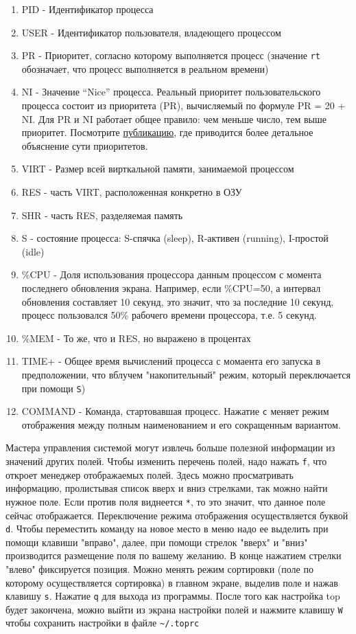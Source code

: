 \documentclass{article}
\begin{document}
\begin{enumerate}
\tightlist
\item
  PID - Идентификатор процесса
\item
  USER - Идентификатор пользователя, владеющего процессом
\item
  PR - Приоритет, согласно которому выполняется процесс (значение
  \texttt{rt} обозначает, что процесс выполняется в реальном времени)
\item
  NI - Значение ``Nice'' процесса. Реальный приоритет пользовательского
  процесса состоит из приоритета (PR), вычисляемый по формуле PR = 20 +
  NI. Для PR и NI работает общее правило: чем меньше число, тем выше
  приоритет. Посмотрите
  \href{https://askubuntu.com/a/656787/917201}{публикацию}, где
  приводится более детальное объяснение сути приоритетов.
\item
  VIRT - Размер всей вирткальной памяти, занимаемой процессом
\item
  RES - часть VIRT, расположенная конкретно в ОЗУ
\item
  SHR - часть RES, разделяемая память
\item
  S - состояние процесса: S-спячка (sleep), R-активен (running),
  I-простой (idle)
\item
  \%CPU - Доля использования процессора данным процессом с момента
  последнего обновления экрана. Например, если \%CPU=50, а интервал
  обновления составляет 10 секунд, это значит, что за последние 10
  секунд, процесс пользовался 50\% рабочего времени процессора, т.е. 5
  секунд.
\item
  \%MEM - То же, что и RES, но выражено в процентах
\item
  TIME+ - Общее время вычислений процесса с момаента его запуска в
  предположении, что вблучем "накопительный" режим, который
  переключается при помощи \texttt{S})
\item
  COMMAND - Команда, стартовавшая процесс. Нажатие \texttt{c} меняет
  режим отображения между полным наименованием и его сокращенным
  вариантом.
\end{enumerate}

Мастера управления системой могут извлечь больше полезной информации из
значений других полей. Чтобы изменить перечень полей, надо нажать
\texttt{f}, что откроет менеджер отображаемых полей. Здесь можно
просматривать информацию, пролистывая список вверх и вниз стрелками, так
можно найти нужное поле. Если против поля виднеется \texttt{*}, то это
значит, что данное поле сейчас отображается. Переключение режима
отображения осуществляется буквой \texttt{d}. Чтобы переместить команду
на новое место в меню надо ее выделить при помощи клавиши "вправо",
далее, при помощи стрелок "вверх" и "вниз" производится размещение поля
по вашему желанию. В конце нажатием стрелки "влево" фиксируется позиция.
Можно менять режим сортировки (поле по которому осуществляется
сортировка) в главном экране, выделив поле и нажав клавишу \texttt{s}.
Нажатие \texttt{q} для выхода из программы. После того как настройка top
будет закончена, можно выйти из экрана настройки полей и нажмите клавишу
\texttt{W} чтобы сохранить настройки в файле
\texttt{\textasciitilde{}/.toprc}
\end{document}
